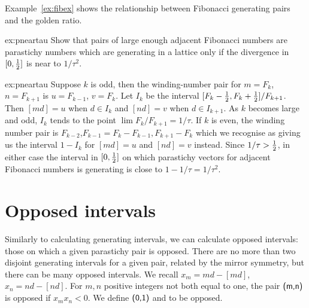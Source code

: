 Example~\ref{ex:fibex} shows the relationship between Fibonacci generating pairs and the golden ratio. 



\begin{jExercise}{ex:pneartau}
	Show that  pairs of large enough adjacent Fibonacci numbers are parastichy numbers which are generating in a lattice only if the divergence in $[0,\textstyle{\frac{1}{2}}]$ is near to $1/\tau^2$.
	\label{ex:fibex}
\end{jExercise}
\begin{jAnswer}{ex:pneartau}
	Suppose $k$ is odd, then the winding-number pair for 
	$m=F_k$, $n=F_{k+1}$ is $u=F_{k-1}$, $v=F_{k}$. 
	Let $I_k$ be the interval $[F_k-\textstyle{\frac{1}{2}},F_k+\textstyle{\frac{1}{2}}]/F_{k+1}$. 
	Then $[md]=u$ when $d\in I_k$ and $[nd]=v$ when $d\in I_{k+1}$.
	As $k$ becomes large and odd, $I_k$ tends to the point $\lim F_k/F_{k+1}=1/\tau$.
	If $k$ is even, the winding number pair is $F_{k-2}$,$F_{k-1} = F_{k}-F_{k-1},F_{k+1}-F_k$ which we recognise as giving us the interval $1-I_k$ for $[md]=u$ and $[nd]=v$ instead.  
Since $1/\tau>\textstyle{\frac{1}{2}}$, in either case the interval in $[0,\textstyle{\frac{1}{2}}]$ on which
parastichy vectors for adjacent Fibonacci numbers
 is generating is close to $1-1/\tau=1/\tau^2$. 	
\end{jAnswer}



\section{Opposed intervals}
Similarly to calculating generating intervals, we can calculate opposed intervals: those on which a given parastichy pair is opposed. There are no more than two disjoint generating intervals for a given pair, related by the mirror symmetry, but there can be many opposed intervals. 
We recall 
$
x_m = m d - [ m d]$,
$
x_n = n d - [ n d ].
$
For $m,n$ positive integers not both equal to one, the pair $\textsf{(m,n)}$ is {opposed} if $x_m x_n <0$.
We define $\textsf{(0,1)}$  and   to be opposed.
\clearpage
